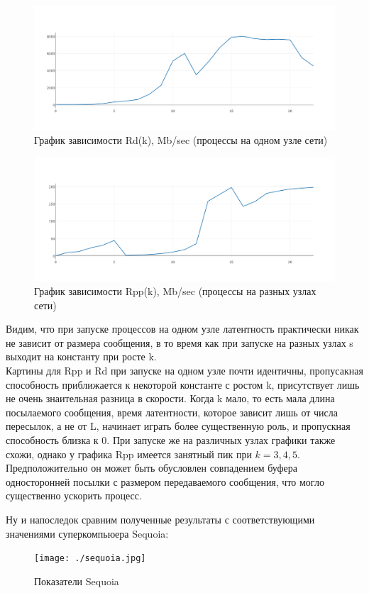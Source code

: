 \documentclass[12pt]{article}
\begin{document}
	\begin{figure}[H]
		\centering
		\includegraphics[scale=0.4]{./graphs/dcap_int.png}
		\caption{График зависимости Rd(k), Mb/sec (процессы на одном узле сети)}
		\captionsetup{labelformat=empty}
	\end{figure}
	
	\begin{figure}[H]
		\centering
		\includegraphics[scale=0.4]{./graphs/dcap_ext.png}
		\caption{График зависимости Rpp(k), Mb/sec (процессы на разных узлах сети)}
		\captionsetup{labelformat=empty}
	\end{figure}
	
	\bigskip
	\qquad Видим, что при запуске процессов на одном узле латентность практически никак не зависит от размера сообщения, в то время как при запуске на разных узлах s выходит на константу при росте k.\\
	\qquad Картины для Rpp и Rd при запуске на одном узле почти идентичны, пропусакная способность приближается к некоторой константе с ростом k, присутствует лишь не очень знаительная разница в скорости. Когда k мало, то есть мала длина посылаемого сообщения, время латентности, которое зависит лишь от числа пересылок, а не от L, начинает играть более существенную роль, и пропускная способность близка к 0. При запуске же на различных узлах графики также схожи, однако у графика Rpp имеется занятный пик при $k=3, 4, 5$. Предположительно он может быть обусловлен совпадением буфера односторонней посылки с размером передаваемого сообщения, что могло существенно ускорить процесс. \\ \bigskip
	
	\qquad Ну и напоследок сравним полученные результаты с соответствующими значениями суперкомпьюера Sequoia:
	\begin{figure}[H]
		\centering
		\texttt{[image: ./sequoia.jpg]}
		\caption{Показатели Sequoia}
		\captionsetup{labelformat=empty}
	\end{figure}
	
\end{document}

